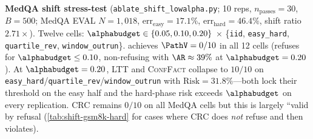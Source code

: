 \begin{table}[!ht]
\caption{\textbf{MedQA shift stress-test} (\texttt{ablate\_shift\_lowalpha.py}; 10 reps, $n_{\text{passes}}=30$, $B=500$; MedQA EVAL $N=1{,}018$, $\mathrm{err}_{\text{easy}}=17.1\%$, $\mathrm{err}_{\text{hard}}=46.4\%$, shift ratio $2.71\times$). Twelve cells: $\alphabudget\in\{0.05,0.10,0.20\}$ $\times$ \{\texttt{iid}, \texttt{easy\_hard}, \texttt{quartile\_rev}, \texttt{window\_outrun}\}. \csa achieves $\PathV=0/10$ in all 12 cells (refuses for $\alphabudget\le 0.10$, non-refusing with $\AR\approx 39\%$ at $\alphabudget=0.20$). At $\alphabudget=0.20$, \textsc{LTT} and \textsc{ConfFact} collapse to $10/10$ on \texttt{easy\_hard}/\texttt{quartile\_rev}/\texttt{window\_outrun} with $\mathrm{Risk}=31.8\%$---both lock their threshold on the easy half and the hard-phase risk exceeds $\alphabudget$ on every replication. \textsc{CRC} remains $0/10$ on all MedQA cells but this is largely ``valid by refusal (\cref{tab:shift-gsm8k-hard} for cases where CRC does \emph{not} refuse and then violates).}
\label{tab:shift-all}
\end{table}

